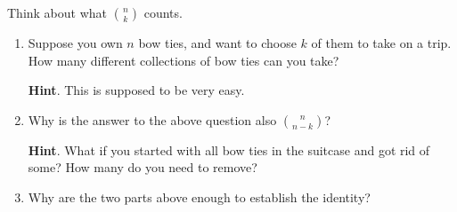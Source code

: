 \documentclass{book}
\begin{document}
\setcounter{cpjt}{74}
\addtocounter{cpjt}{-1}
\begin{activity}\label{act-pascalsym-dc}
\hypertarget{p-557}{}%
Think about what \(\binom{n}{k}\) counts.%
\begin{enumerate}[font=\bfseries,label=(\alph*),ref=\alph*]
\item\label{task-102} \hypertarget{p-558}{}%
Suppose you own \(n\) bow ties, and want to choose \(k\) of them to take on a trip.  How many different collections of bow ties can you take?%
\par\smallskip%
\noindent\textbf{Hint}.\hypertarget{hint-29}{}\quad%
\hypertarget{p-559}{}%
This is supposed to be very easy.%
\item\label{task-103} \hypertarget{p-560}{}%
Why is the answer to the above question also \(\binom{n}{n-k}\)?%
\par\smallskip%
\noindent\textbf{Hint}.\hypertarget{hint-30}{}\quad%
\hypertarget{p-561}{}%
What if you started with all bow ties in the suitcase and got rid of some?  How many do you need to remove?%
\item\label{task-104} \hypertarget{p-562}{}%
Why are the two parts above enough to establish the identity?%
\end{enumerate}
\end{activity}

\clearpage
\end{document}
